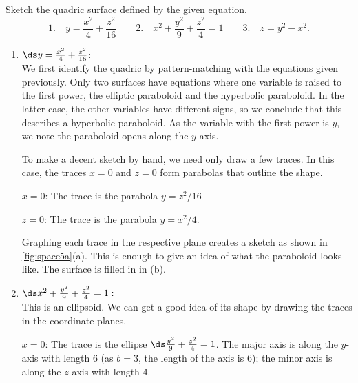 \begin{example}\label{ex_space5}%
Sketch the quadric surface defined by the given equation.
\[
 \text{1.}\quad y=\frac{x^2}{4}+\frac{z^2}{16}\qquad
 \text{2.}\quad x^2+\frac{y^2}{9}+\frac{z^2}{4}=1\qquad
 \text{3.}\quad z=y^2-x^2.
\]
\solution
\begin{enumerate}
	\item $\ds y=\frac{x^2}{4}+\frac{z^2}{16}$:\\
	We first identify the quadric by pattern-matching with the equations given previously. Only two surfaces have equations where one variable is raised to the first power, the elliptic paraboloid and the hyperbolic paraboloid. In the latter case, the other variables have different signs, so we conclude that this describes a hyperbolic paraboloid. As the variable with the first power is $y$, we note the paraboloid opens along the $y$-axis. 
	
	To make a decent sketch by hand, we need only draw a few traces. In this case, the traces $x=0$ and $z=0$ form parabolas that outline the shape.
	
	$x=0$:	The trace is the parabola $y=z^2/16$
	
	$z=0$: 	The trace is the parabola $y=x^2/4$.
	
	Graphing each trace in the respective plane creates a sketch as shown in \autoref{fig:space5a}(a). This is enough to give an idea of what the paraboloid looks like. The surface is filled in in (b).
	
	\item		$\ds x^2+\frac{y^2}{9}+\frac{z^2}{4}=1:$\\
	This is an ellipsoid. We can get a good idea of its shape by drawing the traces in the coordinate planes.
	
	$x=0$: 	The trace is the ellipse $\ds\frac{y^2}{9}+\frac{z^2}{4}=1$. The major axis is along the $y$-axis with length 6 (as $b=3$, the length of the axis is 6); the minor axis is along the $z$-axis with length 4.
	

\end{enumerate}
\end{example}
